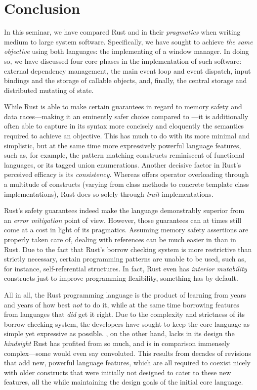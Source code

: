 \section{Conclusion}

In this seminar, we have compared Rust and \cpp in their \textit{pragmatics}
when writing medium to large system software. Specifically, we have sought to
achieve \textit{the same objective} using both languages: the implementing
of a window manager. In doing so, we have discussed four core phases in the
implementation of such software: external dependency management, the main event
loop and event dispatch, input bindings and the storage of callable objects,
and, finally, the central storage and distributed mutating of state.

While Rust is able to make certain guarantees in regard to memory safety and
data races---making it an eminently safer choice compared to \cpp---it is
additionally often able to capture in its syntax more concisely and eloquently
the semantics required to achieve an objective. This has much to do with its
more minimal and simplistic, but at the same time more expressively powerful
language features, such as, for example, the pattern matching constructs
reminiscent of functional languages, or its tagged union enumerations. Another
decisive factor in Rust's perceived efficacy is its \textit{consistency}.
Whereas \cpp offers operator overloading through a multitude of constructs
(varying from class methods to concrete template class implementations), Rust
does so solely through \textit{trait} implementations.

Rust's safety guarantees indeed make the language demonstrably superior from
an \textit{error mitigation} point of view. However, those guarantees can at
times still come at a cost in light of its pragmatics. Assuming memory safety
assertions are properly taken care of, dealing with references can be much
easier in \cpp than in Rust. Due to the fact that Rust's borrow checking system
is more restrictive than strictly necessary, certain programming patterns are
unable to be used, such as, for instance, self-referential structures. In
fact, Rust even has \textit{interior mutability} constructs just to improve
programming flexibility, something \cpp has by default.

All in all, the Rust programming language is the product of learning from years
and years of how best \textit{not} to do it, while at the same time borrowing
features from languages that \textit{did} get it right. Due to the complexity
and strictness of its borrow checking system, the developers have sought to
keep the core language as simple yet expressive as possible. \cpp, on the other
hand, lacks in its design the \textit{hindsight} Rust has profited from so much,
and is in comparison immensely complex---some would even say convoluted. This
results from decades of revisions that add new, powerful language features,
which are all required to coexist nicely with older constructs that were
initially not designed to cater to these new features, all the while maintaining
the design goals of the initial core language.
